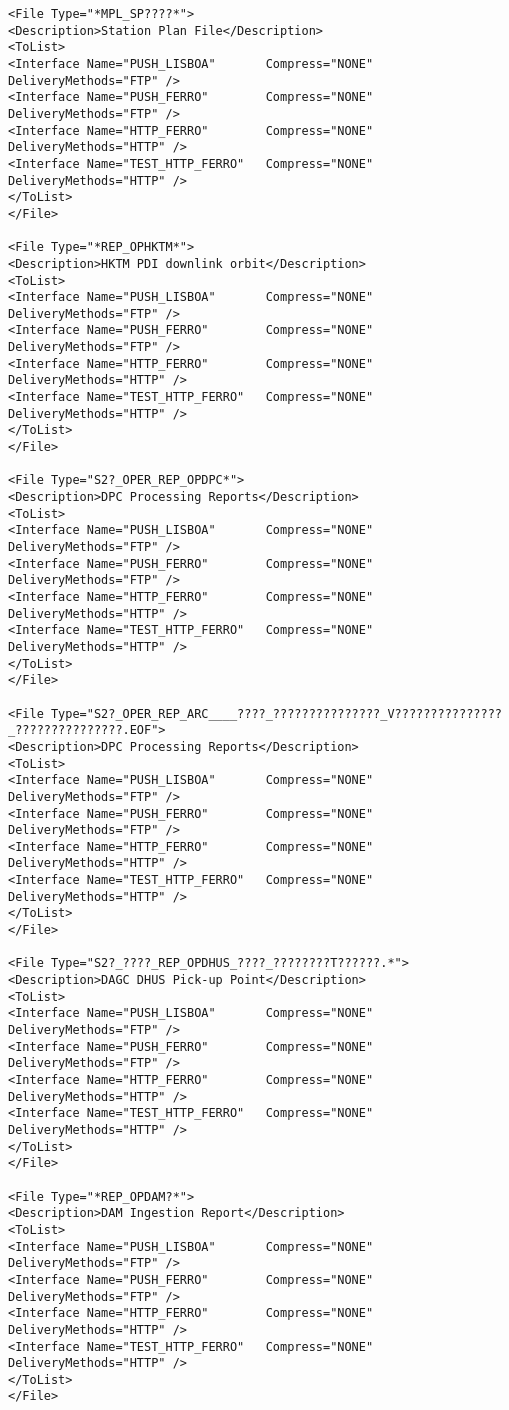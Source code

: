 \documentclass[dec_sum_main.tex]{subfiles}
\begin{document}
\begin{Verbatim}
<File Type="*MPL_SP????*">
<Description>Station Plan File</Description>
<ToList>
<Interface Name="PUSH_LISBOA"       Compress="NONE"   DeliveryMethods="FTP" />
<Interface Name="PUSH_FERRO"        Compress="NONE"   DeliveryMethods="FTP" />
<Interface Name="HTTP_FERRO"        Compress="NONE"   DeliveryMethods="HTTP" />
<Interface Name="TEST_HTTP_FERRO"   Compress="NONE"   DeliveryMethods="HTTP" />
</ToList>
</File>

<File Type="*REP_OPHKTM*">
<Description>HKTM PDI downlink orbit</Description>
<ToList>
<Interface Name="PUSH_LISBOA"       Compress="NONE"   DeliveryMethods="FTP" />
<Interface Name="PUSH_FERRO"        Compress="NONE"   DeliveryMethods="FTP" />
<Interface Name="HTTP_FERRO"        Compress="NONE"   DeliveryMethods="HTTP" />
<Interface Name="TEST_HTTP_FERRO"   Compress="NONE"   DeliveryMethods="HTTP" />
</ToList>
</File>

<File Type="S2?_OPER_REP_OPDPC*">
<Description>DPC Processing Reports</Description>
<ToList>
<Interface Name="PUSH_LISBOA"       Compress="NONE"   DeliveryMethods="FTP" />
<Interface Name="PUSH_FERRO"        Compress="NONE"   DeliveryMethods="FTP" />
<Interface Name="HTTP_FERRO"        Compress="NONE"   DeliveryMethods="HTTP" />
<Interface Name="TEST_HTTP_FERRO"   Compress="NONE"   DeliveryMethods="HTTP" />
</ToList>
</File>

<File Type="S2?_OPER_REP_ARC____????_???????????????_V???????????????_???????????????.EOF">
<Description>DPC Processing Reports</Description>
<ToList>
<Interface Name="PUSH_LISBOA"       Compress="NONE"   DeliveryMethods="FTP" />
<Interface Name="PUSH_FERRO"        Compress="NONE"   DeliveryMethods="FTP" />
<Interface Name="HTTP_FERRO"        Compress="NONE"   DeliveryMethods="HTTP" />
<Interface Name="TEST_HTTP_FERRO"   Compress="NONE"   DeliveryMethods="HTTP" />
</ToList>
</File>

<File Type="S2?_????_REP_OPDHUS_????_????????T??????.*">
<Description>DAGC DHUS Pick-up Point</Description>
<ToList>
<Interface Name="PUSH_LISBOA"       Compress="NONE"   DeliveryMethods="FTP" />
<Interface Name="PUSH_FERRO"        Compress="NONE"   DeliveryMethods="FTP" />
<Interface Name="HTTP_FERRO"        Compress="NONE"   DeliveryMethods="HTTP" />
<Interface Name="TEST_HTTP_FERRO"   Compress="NONE"   DeliveryMethods="HTTP" />
</ToList>
</File>

<File Type="*REP_OPDAM?*">
<Description>DAM Ingestion Report</Description>
<ToList>
<Interface Name="PUSH_LISBOA"       Compress="NONE"   DeliveryMethods="FTP" />
<Interface Name="PUSH_FERRO"        Compress="NONE"   DeliveryMethods="FTP" />
<Interface Name="HTTP_FERRO"        Compress="NONE"   DeliveryMethods="HTTP" />
<Interface Name="TEST_HTTP_FERRO"   Compress="NONE"   DeliveryMethods="HTTP" />
</ToList>
</File>


\end{Verbatim}
\end{document}
